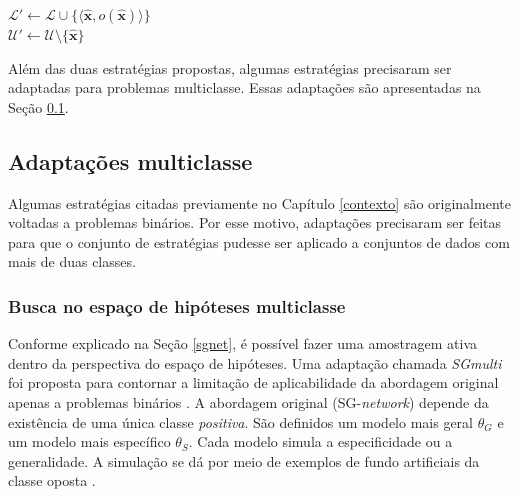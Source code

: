 \begin{algoritmo}
{{  \Se{$\rho < \rho_{\limiar}$}{  
   $\bm{\hat{x}} \leftarrow \argmax\limits_{\bm{x}}[\stratIDATU(\bm{x})]$ \\
  }
  \Senao {
   $\bm{\hat{x}} \leftarrow \argmax\limits_{\bm{x}}[\stratIDTU(\bm{x})]$ \\
  }
  $\mathcal{L}' \leftarrow \mathcal{L} \cup \{\langle \bm{\hat{x}}, o(\bm{\hat{x}}) \rangle\}$ \\
  $\mathcal{U}' \leftarrow \mathcal{U} \setminus \{\bm{\hat{x}}\}$ \\
  \Retorna {}
}}
\end{algoritmo}

Além das duas estratégias propostas, algumas estratégias precisaram ser adaptadas para problemas multiclasse.
Essas adaptações são apresentadas na Seção \ref{adapmulti}.

\subsection{Adaptações multiclasse}\label{adapmulti}
Algumas estratégias citadas previamente no Capítulo \ref{contexto} são originalmente voltadas a problemas binários.
Por esse motivo, adaptações precisaram ser feitas para que o conjunto de estratégias pudesse ser aplicado a conjuntos de dados com mais de duas classes.

\subsubsection{Busca no espaço de hipóteses multiclasse}
Conforme explicado na Seção \ref{sgnet}, é possível fazer uma amostragem ativa dentro da perspectiva do espaço de hipóteses.
Uma adaptação chamada \textit{SGmulti} foi proposta para contornar a limitação de aplicabilidade da abordagem original apenas a problemas binários \cite{conf/hais/SantosC14}.
A abordagem original (SG-\textit{network}) depende da existência de uma única classe \textit{positiva}.
São definidos um modelo mais geral $\theta_{G}$ e um modelo mais específico $\theta_{S}$.
Cada modelo simula a especificidade ou a generalidade.
A simulação se dá por meio de exemplos de fundo artificiais da classe oposta \cite{series/synthesis/2012Settles}.

